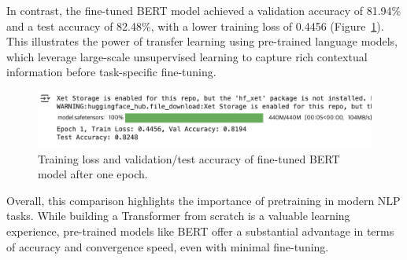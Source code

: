 In contrast, the fine-tuned BERT model achieved a validation accuracy of 81.94\% and a test accuracy of 82.48\%, with a lower training loss of 0.4456 (Figure~\ref{fig:bert_result}). This illustrates the power of transfer learning using pre-trained language models, which leverage large-scale unsupervised learning to capture rich contextual information before task-specific fine-tuning.

\begin{figure}[t]
\centering
\includegraphics[width=0.85\linewidth]{result.png}
\caption{Training loss and validation/test accuracy of fine-tuned BERT model after one epoch.}
\label{fig:bert_result}
\end{figure}

Overall, this comparison highlights the importance of pretraining in modern NLP tasks. While building a Transformer from scratch is a valuable learning experience, pre-trained models like BERT offer a substantial advantage in terms of accuracy and convergence speed, even with minimal fine-tuning.



